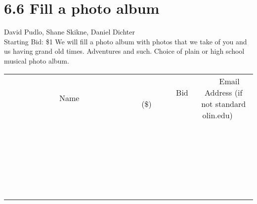 \documentclass[11pt]{article}
\begin{document}
\section*{6.6 Fill a photo album}
David Pudlo, Shane Skikne, Daniel Dichter
\\
Starting Bid: \$1
\newline
We will fill a photo album with photos that we take of you and us having grand old times. Adventures and such. Choice of plain or high school musical photo album.
\\[6ex]
\begin{tabular}{c c c}
~~~~~~~~~~~~~Name~~~~~~~~~~~~~ & ~~~~~~~~~Bid (\$)~~~~~~~~~  & ~~~Email Address (if not standard olin.edu)~~~\\
 & & \\
\hline
 & & \\
\hline
 & & \\
\hline
 & & \\
\hline
 & & \\
\hline
 & & \\
\hline
 & & \\
\hline
 & & \\
\hline
 & & \\
\hline
 & & \\
\hline
 & & \\
\hline
 & & \\
\hline
 & & \\
\hline
 & & \\
\hline
 & & \\
\hline
 & & \\
\hline
 & & \\
\hline
 & & \\
\hline
 & & \\
\hline
 & & \\
\hline
 & & \\
\hline
 & & \\
\hline
 & & \\
\hline
 & & \\
\hline
 & & \\
\hline
 & & \\
\hline
\end{tabular}
\newpage
\end{document}
